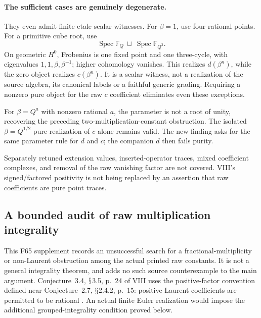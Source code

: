 \documentclass[11pt,a4paper]{article}
\renewcommand{\S}{\ensuremath{\mathsection}}
\newcommand{\fid}[1]{\textsf{#1}}\newcommand{\gate}[1]{\textsf{#1}}
\theoremstyle{named}\newtheorem{finding}{Finding}[section]
\theoremstyle{definition}\newtheorem{definition}[finding]{Definition}
\theoremstyle{remark}\newtheorem{remark}[finding]{Remark}
\begin{document}
\paragraph{The sufficient cases are genuinely degenerate.}
They even admit finite-etale scalar witnesses.
For \(\beta=1\), use four rational points.
For a primitive cube root, use
\[
              \operatorname{Spec}\mathbb F_Q
                  \ \sqcup\
              \operatorname{Spec}\mathbb F_{Q^3}.
\]
On geometric \(H^0\), Frobenius is one fixed point
and one three-cycle, with eigenvalues
\(1,1,\beta,\beta^{-1}\); higher cohomology vanishes.
This realizes \(d(\beta^n)\), while the zero object
realizes \(c(\beta^n)\).
It is a scalar witness, not a realization of the
source algebra, its canonical labels or a faithful
generic grading. Requiring a nonzero pure object
for the raw \(c\) coefficient eliminates even these
exceptions.

For \(\beta=Q^a\) with nonzero rational \(a\),
the parameter is not a root of unity, recovering
the preceding two-multiplication-constant obstruction.
The isolated \(\beta=Q^{1/2}\) pure realization of
\(c\) alone remains valid. The new finding asks for
the same parameter rule for \(d\) and \(c\); the
companion \(d\) then fails purity.

Separately retuned extension values, inserted-operator
traces, mixed coefficient complexes, and removal
of the raw vanishing factor are not covered.
VIII's signed/factored positivity is not being
replaced by an assertion that raw coefficients are
pure point traces.

\subsection{A bounded audit of raw multiplication integrality}

This \fid{F65} supplement records an unsuccessful
search for a fractional-multiplicity or non-Laurent
obstruction among the actual printed raw constants.
It is not a general integrality theorem, and adds
no such source counterexample to the main argument.
Conjecture~3.4, \S3.5, p.~24 of VIII uses the
positive-factor convention defined near
Conjecture~2.7, \S2.4.2, p.~15: positive Laurent
coefficients are permitted to be rational
\cite{VIII}. An actual finite Euler realization
would impose the additional grouped-integrality
condition proved below.
\end{document}
